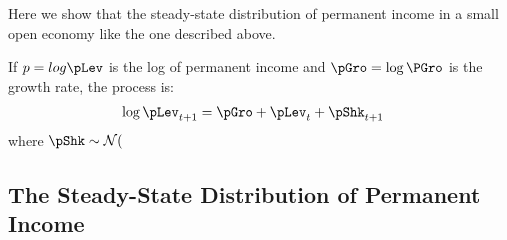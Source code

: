 \documentclass[../BufferStockTheory.tex]{subfiles}
\begin{document}

  \providecommand{\pLog}{\ensuremath{p}}

  Here we show that the steady-state distribution of permanent income in a
  small open economy like the one described above.

  If $\pLog = log \pLev$ is the log of permanent income and $\pGro = \log \PGro$ is the growth rate, the process is:  
  \begin{align}
    \log \pLev_{t+1} & = \pGro + \pLev_{t} + \pShk_{t+1}
  \end{align}
  where $\pShk \sim \mathcal{N}($
\subsection{The Steady-State Distribution of Permanent Income}

\onlyinsubfile{}
\end{document}
